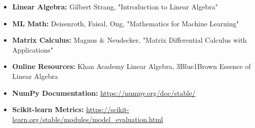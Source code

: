 \documentclass{article}
\begin{document}
\begin{itemize}
    \item \textbf{Linear Algebra:} Gilbert Strang, "Introduction to Linear Algebra"
    \item \textbf{ML Math:} Deisenroth, Faisal, Ong, "Mathematics for Machine Learning" 
    \item \textbf{Matrix Calculus:} Magnus \& Neudecker, "Matrix Differential Calculus with Applications"
    \item \textbf{Online Resources:} Khan Academy Linear Algebra, 3Blue1Brown Essence of Linear Algebra
    \item \textbf{NumPy Documentation:} \url{https://numpy.org/doc/stable/}
    \item \textbf{Scikit-learn Metrics:} \url{https://scikit-learn.org/stable/modules/model_evaluation.html}
\end{itemize}
\end{document}
